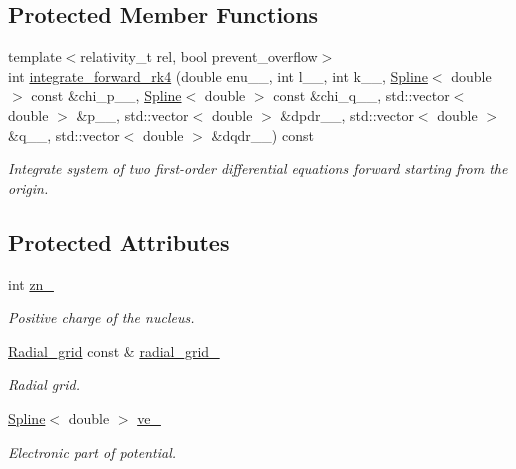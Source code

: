 \subsection*{Protected Member Functions}
\begin{DoxyCompactItemize}
\item 
{\footnotesize template$<$relativity\+\_\+t rel, bool prevent\+\_\+overflow$>$ }\\int \hyperlink{classsirius_1_1_radial__solver_a72eaf443ca2f81c7d416d0c4f04e7ebb}{integrate\+\_\+forward\+\_\+rk4} (double enu\+\_\+\+\_\+, int l\+\_\+\+\_\+, int k\+\_\+\+\_\+, \hyperlink{classsirius_1_1_spline}{Spline}$<$ double $>$ const \&chi\+\_\+p\+\_\+\+\_\+, \hyperlink{classsirius_1_1_spline}{Spline}$<$ double $>$ const \&chi\+\_\+q\+\_\+\+\_\+, std\+::vector$<$ double $>$ \&p\+\_\+\+\_\+, std\+::vector$<$ double $>$ \&dpdr\+\_\+\+\_\+, std\+::vector$<$ double $>$ \&q\+\_\+\+\_\+, std\+::vector$<$ double $>$ \&dqdr\+\_\+\+\_\+) const 
\begin{DoxyCompactList}\small\item\em Integrate system of two first-\/order differential equations forward starting from the origin. \end{DoxyCompactList}\end{DoxyCompactItemize}
\subsection*{Protected Attributes}
\begin{DoxyCompactItemize}
\item 
int \hyperlink{classsirius_1_1_radial__solver_a7f03ef84b603fa56fa0ee2d263f48eed}{zn\+\_\+}
\begin{DoxyCompactList}\small\item\em Positive charge of the nucleus. \end{DoxyCompactList}\item 
\hyperlink{classsirius_1_1_radial__grid}{Radial\+\_\+grid} const \& \hyperlink{classsirius_1_1_radial__solver_a363ba1f94d4ae7194fb65119c4af455d}{radial\+\_\+grid\+\_\+}
\begin{DoxyCompactList}\small\item\em Radial grid. \end{DoxyCompactList}\item 
\hyperlink{classsirius_1_1_spline}{Spline}$<$ double $>$ \hyperlink{classsirius_1_1_radial__solver_a8766ca2d2e048ee1e4451940ceb7f0a7}{ve\+\_\+}
\begin{DoxyCompactList}\small\item\em Electronic part of potential. \end{DoxyCompactList}\end{DoxyCompactItemize}


